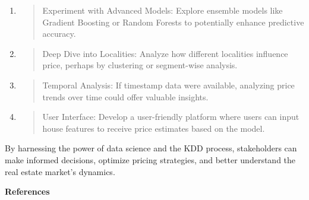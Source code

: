 \documentclass[]{article}
\newcommand{\textcenter}[1]{\begin{center} \vspace{10px}\textbf{\large #1} \end{center}}
\begin{document}
\begin{enumerate}
\def\labelenumi{\arabic{enumi}.}
\item
  \begin{quote}
  Experiment with Advanced Models: Explore ensemble models like Gradient
  Boosting or Random Forests to potentially enhance predictive accuracy.
  \end{quote}
\item
  \begin{quote}
  Deep Dive into Localities: Analyze how different localities influence
  price, perhaps by clustering or segment-wise analysis.
  \end{quote}
\item
  \begin{quote}
  Temporal Analysis: If timestamp data were available, analyzing price
  trends over time could offer valuable insights.
  \end{quote}
\item
  \begin{quote}
  User Interface: Develop a user-friendly platform where users can input
  house features to receive price estimates based on the model.
  \end{quote}
\end{enumerate}

By harnessing the power of data science and the KDD process,
stakeholders can make informed decisions, optimize pricing strategies,
and better understand the real estate market's dynamics.

\textcenter{References}
\end{document}
